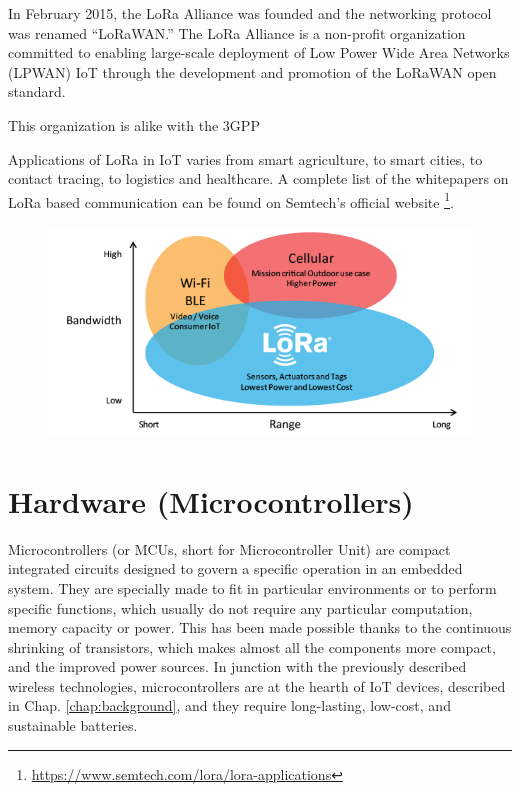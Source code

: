 		In February 2015, the LoRa Alliance was founded and the networking protocol was renamed “LoRaWAN.”
		The LoRa Alliance is a non-profit organization committed to enabling large-scale deployment of Low Power Wide Area Networks (LPWAN) IoT through the development and promotion of the LoRaWAN open standard.
		
		This organization is alike with the 3GPP 
		
		Applications of LoRa in IoT varies from smart agriculture, to smart cities, to contact tracing, to logistics and healthcare.
		A complete list of the whitepapers on LoRa based communication can be found on Semtech's official website \footnote{\url{https://www.semtech.com/lora/lora-applications}}.
		
		
		\begin{figure}[H]
			\centering
			\includegraphics[width=\textwidth]{resources/img/LoRa_Why_Range}
			\caption{}
		\end{figure}


\section{Hardware (Microcontrollers)}\label{sec:microcontrollers}


	Microcontrollers (or MCUs, short for Microcontroller Unit) are compact integrated circuits designed to govern a specific operation in an embedded system.
	They are specially made to fit in particular environments or to perform specific functions, which usually do not require any particular computation, memory capacity or power.
	This has been made possible thanks to the continuous shrinking of transistors, which makes almost all the components more compact, and the improved power sources.
	In junction with the previously described wireless technologies, microcontrollers are at the hearth of IoT devices, described in Chap. \ref{chap:background}, and they require long-lasting, low-cost, and sustainable batteries.
	
